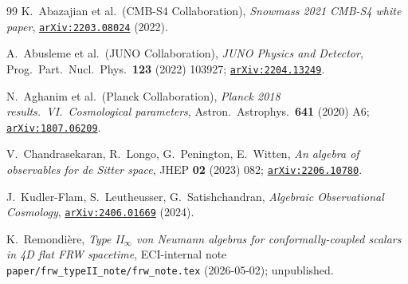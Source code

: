 \documentclass[a4paper,11pt]{article}
\newcommand{\arXiv}[1]{\href{https://arxiv.org/abs/#1}{\texttt{arXiv:#1}}}
\theoremstyle{definition}
\theoremstyle{remark}
\begin{document}
\begin{thebibliography}{99}
K.~Abazajian et al.\ (CMB-S4 Collaboration),
\emph{Snowmass 2021 CMB-S4 white paper},
\arXiv{2203.08024} (2022).

A.~Abusleme et al.\ (JUNO Collaboration),
\emph{JUNO Physics and Detector},
Prog.\ Part.\ Nucl.\ Phys.\ \textbf{123} (2022) 103927;
\arXiv{2204.13249}.

N.~Aghanim et al.\ (Planck Collaboration),
\emph{Planck 2018 results.\ VI.\ Cosmological parameters},
Astron.~Astrophys.\ \textbf{641} (2020) A6;
\arXiv{1807.06209}.


V.~Chandrasekaran, R.~Longo, G.~Penington, E.~Witten,
\emph{An algebra of observables for de Sitter space},
JHEP \textbf{02} (2023) 082;
\arXiv{2206.10780}.

J.~Kudler-Flam, S.~Leutheusser, G.~Satishchandran,
\emph{Algebraic Observational Cosmology},
\arXiv{2406.01669} (2024).

K.~Remondi\`ere,
\emph{Type II$_\infty$ von Neumann algebras for conformally-coupled
scalars in 4D flat FRW spacetime},
ECI-internal note \texttt{paper/frw\_typeII\_note/frw\_note.tex}
(2026-05-02); unpublished.



\end{thebibliography}
\end{document}
